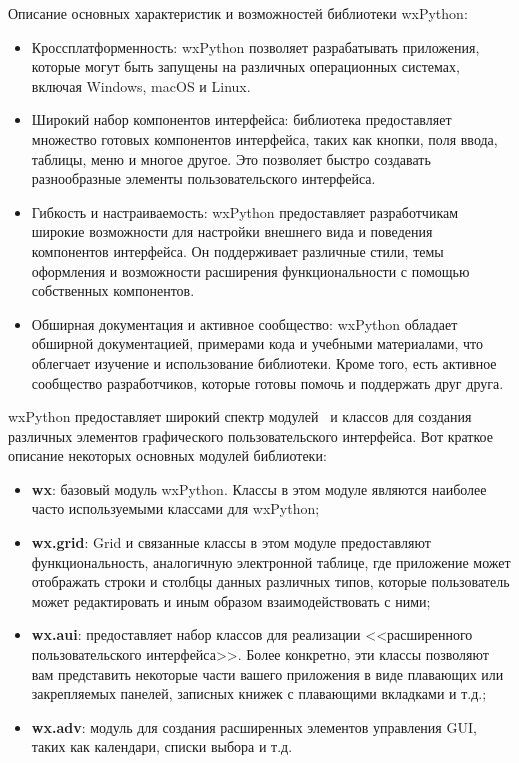Описание основных характеристик и возможностей библиотеки wxPython:
\begin{itemize}
\item Кроссплатформенность: wxPython позволяет разрабатывать приложения, которые могут быть запущены на различных операционных системах, включая Windows, macOS и Linux.
\item Широкий набор компонентов интерфейса: библиотека предоставляет множество готовых компонентов интерфейса, таких как кнопки, поля ввода, таблицы, меню и многое другое. Это позволяет быстро создавать разнообразные элементы пользовательского интерфейса.
\item Гибкость и настраиваемость: wxPython предоставляет разработчикам широкие возможности для настройки внешнего вида и поведения компонентов интерфейса. Он поддерживает различные стили, темы оформления и возможности расширения функциональности с помощью собственных компонентов.
\item Обширная документация и активное сообщество: wxPython обладает обширной документацией, примерами кода и учебными материалами, что облегчает изучение и использование библиотеки. Кроме того, есть активное сообщество разработчиков, которые готовы помочь и поддержать друг друга.
\end{itemize}

wxPython предоставляет широкий спектр модулей~\cite{p15} и классов для создания различных элементов графического пользовательского интерфейса. Вот краткое описание некоторых основных модулей библиотеки:
\begin{itemize}
\item \textbf{wx}: базовый модуль wxPython. Классы в этом модуле являются наиболее часто используемыми классами для wxPython;
\item \textbf{wx.grid}: Grid и связанные классы в этом модуле предоставляют функциональность, аналогичную электронной таблице, где приложение может отображать строки и столбцы данных различных типов, которые пользователь может редактировать и иным образом взаимодействовать с ними;
\item \textbf{wx.aui}: предоставляет набор классов для реализации <<расширенного пользовательского интерфейса>>. Более конкретно, эти классы позволяют вам представить некоторые части вашего приложения в виде плавающих или закрепляемых панелей, записных книжек с плавающими вкладками и т.д.;
\item \textbf{wx.adv}: модуль для создания расширенных элементов управления GUI, таких как календари, списки выбора и т.д.
\end{itemize}
